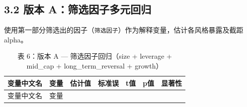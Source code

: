 \documentclass[
]{article}
\begin{document}
\subsection{3.2 版本
A：筛选因子多元回归}\label{ux7248ux672c-aux7b5bux9009ux56e0ux5b50ux591aux5143ux56deux5f52}

使用第一部分筛选出的因子（\texttt{筛选因子}）作为解释变量，估计各风格暴露及截距
alpha。

\begin{longtable}[]{@{}
  >{\raggedright\arraybackslash}p{}
  >{\raggedright\arraybackslash}p{}
  >{\raggedleft\arraybackslash}p{}
  >{\raggedleft\arraybackslash}p{}
  >{\raggedleft\arraybackslash}p{}
  >{\raggedleft\arraybackslash}p{}
  >{\raggedright\arraybackslash}p{}@{}}
\caption{表 6：版本 A --- 筛选因子回归（size + leverage + mid\_cap +
long\_term\_reversal + growth）}\tabularnewline
\toprule\noalign{}
\begin{minipage}[b]{\linewidth}\raggedright
变量中文名
\end{minipage} & \begin{minipage}[b]{\linewidth}\raggedright
变量
\end{minipage} & \begin{minipage}[b]{\linewidth}\raggedleft
估计值
\end{minipage} & \begin{minipage}[b]{\linewidth}\raggedleft
标准误
\end{minipage} & \begin{minipage}[b]{\linewidth}\raggedleft
t值
\end{minipage} & \begin{minipage}[b]{\linewidth}\raggedleft
p值
\end{minipage} & \begin{minipage}[b]{\linewidth}\raggedright
显著性
\end{minipage} \\
\midrule\noalign{}
\endfirsthead
\toprule\noalign{}
\begin{minipage}[b]{\linewidth}\raggedright
变量中文名
\end{minipage} & \begin{minipage}[b]{\linewidth}\raggedright
变量
\end{minipage} & \begin{minipage}[b]{\linewidth}\raggedleft

\end{minipage}
\end{longtable}
\end{document}

